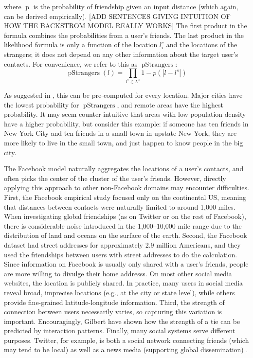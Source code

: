 \documentclass[letterpaper]{article}
\DeclareMathOperator{\pStrangers}{pStrangers}
\DeclareMathOperator{\p}{p}
\begin{document}
\noindent where $\p$ is the probability of friendship given an input distance (which again, can be derived empirically).
%
[ADD SENTENCES GIVING INTUITION OF HOW THE BACKSTROM MODEL REALLY WORKS]
%
The first product in the formula combines the probabilities from a user's friends.
%
The last product in the likelihood formula is only a function of the location $l^c_i$ and the locations of the strangers; it does not depend on any other information about the target user's contacts. For convenience, we refer to this as $\pStrangers$:
\[
    \pStrangers(l) = \prod_{l^s \in L^s}1-p(|l-l^s|)
\]

\noindent As suggested in \cite{backstrom2010find}, this can be pre-computed for every location.
Major cities have the lowest probability for $\pStrangers$, and remote areas have the highest probability.
It may seem counter-intuitive that areas with low population density have a
higher probability, but consider this example: if someone has ten friends in
New York City and ten friends in a small town in upstate New York, they are
more likely to live in the small town, and just happen to know people in the
big city.


The Facebook model naturally aggregates the locations of a user's contacts,
and often picks the center of the cluster of the user's friends.
%
However, directly applying this approach to other non-Facebook domains may encounter difficulties.
%
First, the Facebook empirical study focused only on the continental US, meaning
that distances between contacts were naturally limited to around 1,000 miles.
%
When investigating global friendships (as on Twitter or on the rest of
Facebook), there is considerable noise introduced in the 1,000--10,000 mile
range due to the distribution of land and oceans on the surface of the earth.
%
Second, the Facebook dataset had street addresses for approximately 2.9 million
Americans, and they used the friendships between users with street addresses to
do the calculation.
%
Since information on Facebook is usually only shared with a user's friends,
people are more willing to divulge their home addresss.
%
On most other social media websites, the location is publicly shared.
%
In practice, many users in social media reveal broad, imprecise
locations (e.g., at the city or state level), while others provide fine-grained
latitude-longitude information.
%
Third, the strength of connection between users necessarily varies, so capturing this variation is important. Encouragingly, Gilbert \cite{gilbert2009predicting} have shown how the strength of a tie can be predicted by interaction patterns.  Finally, many social systems serve different purposes. Twitter, for example, is both a social network connecting friends (which may tend to be local) as well as a news media (supporting global dissemination)  \cite{kwak2010why}.
\end{document}
